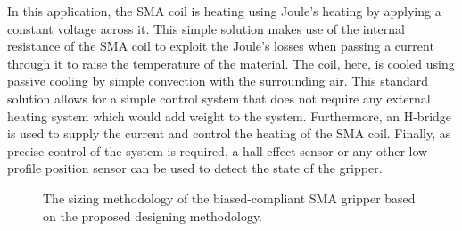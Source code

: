 In this application, the SMA coil is heating using Joule's heating by applying a constant voltage across it. This simple solution makes use of the internal resistance of the SMA coil to exploit the Joule's losses when passing a current through it to raise the temperature of the material. The coil, here, is cooled using passive cooling by simple convection with the surrounding air. This standard solution allows for a simple control system that does not require any external heating system which would add weight to the system. Furthermore, an H-bridge is used to supply the current and control the heating of the SMA coil. Finally, as precise control of the system is required, a hall-effect sensor or any other low profile position sensor can be used to detect the state of the gripper.

\begin{figure}[hbt!] %
  \centering
  \resizebox{0.9\textwidth}{!}{}
  \caption{The sizing methodology of the biased-compliant SMA gripper based on the proposed designing methodology.}
  \label{fig:mandrel-gripperwp}
\end{figure}

